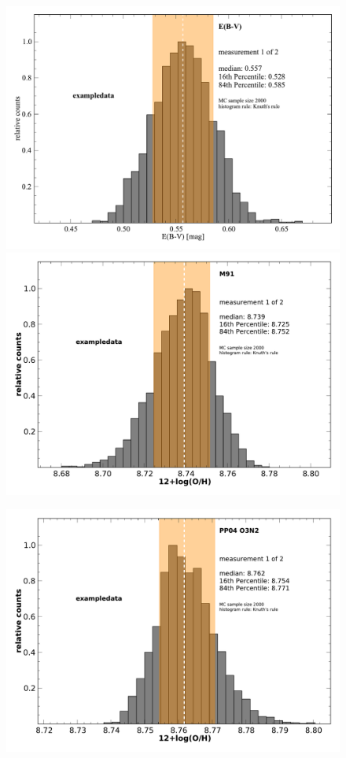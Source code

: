 \documentclass{emulateapj}
\begin{document}
\begin{figure}[!HT]
\begin{center}
\centerline{
\includegraphics[width=0.95\columnwidth]{exampledata_n2000_EB-V_1.pdf}
\includegraphics[width=0.95\columnwidth]{exampledata_n2000_M91_1.pdf}}
\vspace{0.2in}
\centerline{
\includegraphics[width=0.95\columnwidth]{exampledata_n2000_PP04_O3N2_1.pdf}
}
\end{center}
\end{figure}
\end{document}
